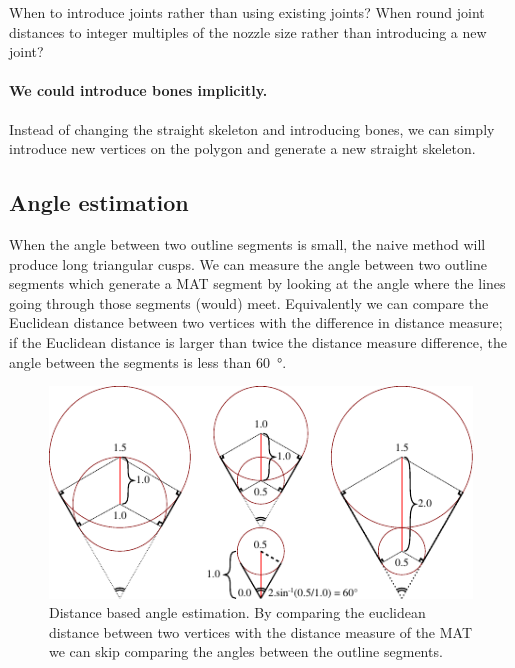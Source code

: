When to introduce joints rather than using existing joints? When round joint distances to integer multiples of the nozzle size rather than introducing a new joint?

\paragraph{We could introduce bones implicitly.}
Instead of changing the straight skeleton and introducing bones,
we can simply introduce new vertices on the polygon and generate a new straight skeleton.








\subsection{Angle estimation}
When the angle between two outline segments is small, the naive method will produce long triangular cusps.
We can measure the angle between two outline segments which generate a MAT segment by looking at the angle where the lines going through those segments (would) meet.
Equivalently we can compare the Euclidean distance between two vertices with the difference in distance measure;
if the Euclidean distance is larger than twice the distance measure difference, the angle between the segments is less than {\SI{60}{\degree}}.

\begin{figure}[H]
\centering
\includegraphics[width=.9\columnwidth]{sources/method/distance_based_angles.pdf}
\caption{Distance based angle estimation. By comparing the euclidean distance between two vertices with the distance measure of the MAT we can skip comparing the angles between the outline segments.}
\label{distance_based_angles}
\end{figure}

